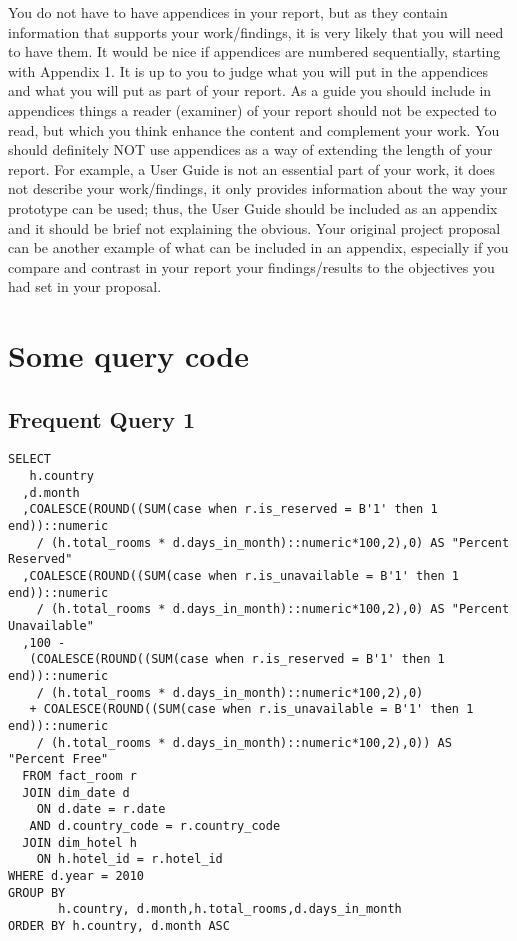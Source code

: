 \begin{appendices}
You do not have to have appendices in your report, but as they contain information that supports your work/findings, it is very likely that you will need to have them. It would be nice if appendices are numbered sequentially, starting with Appendix 1. It is up to you to judge what you will put in the appendices and what you will put as part of your report. As a guide you should include in appendices things a reader (examiner) of your report should not be expected to read, but which you think enhance the content and complement your
work. You should definitely NOT use appendices as a way of extending the length of your report. For example, a User Guide is not an essential part of your work, it does not describe your work/findings, it only provides information about the way your prototype can be used; thus, the User Guide should be included as an appendix and it should be brief not explaining the obvious. Your original project proposal can be another example of what can be included in an appendix, especially if you compare and contrast in your report your findings/results to the objectives you had set in your proposal.

\chapter{Some query code}
\section{Frequent Query 1}
\begin{lstlisting}[style=mySQL]
SELECT 
   h.country
  ,d.month
  ,COALESCE(ROUND((SUM(case when r.is_reserved = B'1' then 1 end))::numeric
    / (h.total_rooms * d.days_in_month)::numeric*100,2),0) AS "Percent Reserved"
  ,COALESCE(ROUND((SUM(case when r.is_unavailable = B'1' then 1 end))::numeric
    / (h.total_rooms * d.days_in_month)::numeric*100,2),0) AS "Percent Unavailable"
  ,100 -
   (COALESCE(ROUND((SUM(case when r.is_reserved = B'1' then 1 end))::numeric
    / (h.total_rooms * d.days_in_month)::numeric*100,2),0)
   + COALESCE(ROUND((SUM(case when r.is_unavailable = B'1' then 1 end))::numeric
    / (h.total_rooms * d.days_in_month)::numeric*100,2),0)) AS "Percent Free" 
  FROM fact_room r
  JOIN dim_date d
    ON d.date = r.date
   AND d.country_code = r.country_code
  JOIN dim_hotel h
    ON h.hotel_id = r.hotel_id 
WHERE d.year = 2010    
GROUP BY
       h.country, d.month,h.total_rooms,d.days_in_month
ORDER BY h.country, d.month ASC
\end{lstlisting}


\end{appendices}
